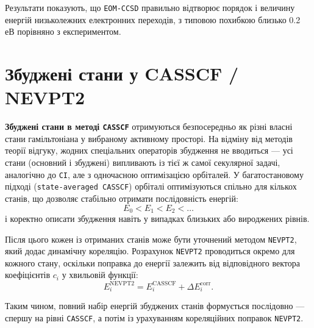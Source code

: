 Результати показують, що \texttt{EOM-CCSD} правильно відтворює порядок і величину енергій
низьколежних електронних переходів, з типовою похибкою близько 0.2 еВ порівняно з експериментом.



\section{Збуджені стани у CASSCF / NEVPT2}


\textbf{Збуджені стани в методі \texttt{CASSCF}} отримуються безпосередньо як різні власні стани гамільтоніана
у вибраному активному просторі.
На відміну від методів теорії відгуку,
жодних спеціальних операторів збудження не вводиться ---
усі стани (основний і збуджені) випливають із тієї ж самої секулярної задачі,
аналогічно до \texttt{CI}, але з одночасною оптимізацією орбіталей.
У багатостановому підході (\texttt{state-averaged CASSCF}) орбіталі оптимізуються спільно для кількох станів,
що дозволяє стабільно отримати послідовність енергій:
\[
    E_0 < E_1 < E_2 < \dots
\]
і коректно описати збудження навіть у випадках близьких або вироджених рівнів.

Після цього кожен із отриманих станів може бути уточнений методом \texttt{NEVPT2},
який додає динамічну кореляцію.
Розрахунок \texttt{NEVPT2} проводиться окремо для кожного стану,
оскільки поправка до енергії залежить від відповідного вектора коефіцієнтів $c_i$ у хвильовій функції:
\[
    E_i^{\text{NEVPT2}} = E_i^{\text{CASSCF}} + \Delta E_i^{\text{corr}}.
\]

Таким чином, повний набір енергій збуджених станів формується послідовно ---
спершу на рівні \texttt{CASSCF}, а потім із урахуванням кореляційних поправок \texttt{NEVPT2}.


